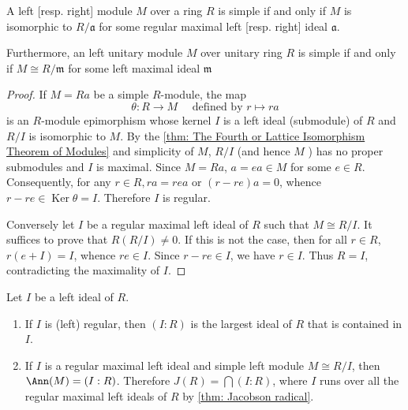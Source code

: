 \begin{theorem}
    \label{thm: simple module}
    A left [resp. right] module $M$ over a ring $R$ is simple if and only if $M$ is isomorphic to $R/\mathfrak{a}$ for some regular maximal left [resp. right] ideal $\mathfrak{a}$.

    Furthermore, an left unitary module $M$ over unitary ring $R$ is simple if and only if $M\cong R/\mathfrak{m}$ for some left maximal ideal $\mathfrak{m}$

    \begin{proof}
        If $M=Ra$ be a simple $R$-module, the map \begin{equation*}
            \theta: R \rightarrow M \quad\text{ defined by } r \mapsto r a
        \end{equation*}
        is an $R$-module epimorphism whose kernel $I$ is a left ideal (submodule) of $R$ and $R / I$ is isomorphic to $M$.
        By the \ref{thm: The Fourth or Lattice Isomorphism Theorem of Modules} and simplicity of $M$, $R / I$ (and hence $M$ ) has no proper submodules and $I$ is maximal.
        Since $M=Ra$, $a=e a\in M$ for some $e \in R$. Consequently, for any $r \in R, r a=r e a$ or $(r-r e) a=0$, whence $r-r e \in \operatorname{Ker} \theta=I$.
        Therefore $I$ is regular.

        Conversely let $I$ be a regular maximal left ideal of $R$ such that $M \cong R / I$.
        It suffices to prove that $R(R / I) \neq 0$. If this is not the case, then for all $r \in R$, $r(e+I)=I$, whence $r e \in I$. Since $r-r e \in I$, we have $r \in I$. Thus $R=I$, contradicting the maximality of $I$.
    \end{proof}
\end{theorem}


\begin{proposition}
    Let $I$ be a left ideal of $R$.
    \begin{enumerate}
        \item
              If $I$ is (left) regular, then $(I: R)$ is the largest ideal of $R$ that is contained in $I$.
        \item
              If $I$ is a regular maximal left ideal and simple left module $M \cong R / I$, then $\Ann(M)=(I: R)$.
              Therefore $J(R)=\bigcap(I: R)$, where $I$ runs over all the regular maximal left ideals of $R$ by \ref{thm: Jacobson radical}.
    \end{enumerate}
\end{proposition}




